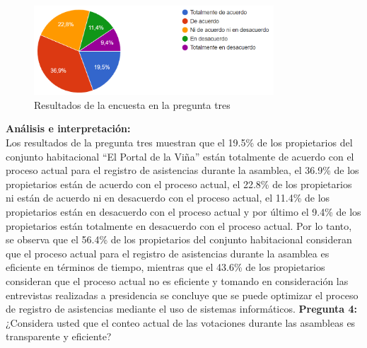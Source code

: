     \begin{figure}[H]
        \centering
        \includegraphics[width=0.8\textwidth]{resources/images/p3}
        \caption{Resultados de la encuesta en la pregunta tres}\label{fig:figure_p3}
    \end{figure}

\textbf{Análisis e interpretación:}\\
Los resultados de la pregunta tres muestran que el 19.5\% de los propietarios del conjunto habitacional {\textquotedblleft}El Portal de la Viña{\textquotedblright} están totalmente de acuerdo con el proceso actual para el registro de asistencias durante la asamblea, el 36.9\% de los propietarios están de acuerdo con el proceso actual, el 22.8\% de los propietarios ni están de acuerdo ni en desacuerdo con el proceso actual, el 11.4\% de los propietarios están en desacuerdo con el proceso actual y por último el 9.4\% de los propietarios están totalmente en desacuerdo con el proceso actual.
Por lo tanto, se observa que el 56.4\% de los propietarios del conjunto habitacional consideran que el proceso actual para el registro de asistencias durante la asamblea es eficiente en términos de tiempo, mientras que el 43.6\% de los propietarios consideran que el proceso actual no es eficiente y tomando en consideración las entrevistas realizadas a presidencia se concluye que se puede optimizar el proceso de registro de asistencias mediante el uso de sistemas informáticos.
\bigbreak
\textbf{Pregunta 4:} ¿Considera usted que el conteo actual de las votaciones durante las asambleas es transparente y eficiente?

